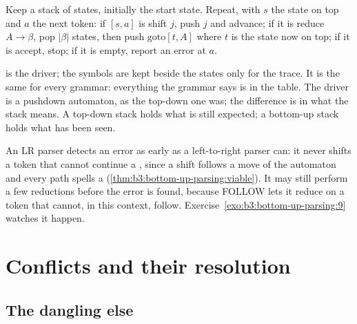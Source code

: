 \label{out:b3:bottom-up-parsing:table}

\begin{method}\label{met:b3:bottom-up-parsing:driver}
Keep a stack of states, initially the start state. Repeat, with $s$ the state on top and $a$ the next token: if $[s, a]$ is shift $j$, push $j$ and advance; if it is reduce $A \to \beta$, pop $|\beta|$ states, then push $\mathrm{goto}[t, A]$ where $t$ is the state now on top; if it is accept, stop; if it is empty, report an error at $a$.
\end{method}

 is the driver; the symbols are kept beside the states only for the trace. It is the same for every grammar: everything the grammar says is in the table. The driver is a pushdown automaton, as the top-down one was; the difference is in what the stack means. A top-down stack holds what is still expected; a bottom-up stack holds what has been seen.

\label{lst:b3:bottom-up-parsing:driver}

An LR parser detects an error as early as a left-to-right parser can: it never shifts a token that cannot continue a , since a shift follows a move of the automaton and every path spells a  (\cref{thm:b3:bottom-up-parsing:viable}). It may still perform a few reductions before the error is found, because FOLLOW lets it reduce on a token that cannot, in this context, follow. Exercise~\ref{exo:b3:bottom-up-parsing:9} watches it happen.

\section{Conflicts and their resolution}\label{sec:b3:bottom-up-parsing:conflicts}

\subsection{The dangling else}

